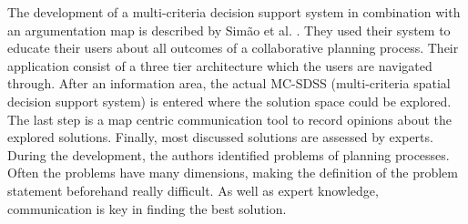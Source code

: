 The development of a multi-criteria decision support system in combination with an argumentation map is described by Sim\~{a}o et al. \cite{Simao2009Webbased}. They used their system to educate their users about all outcomes of a collaborative planning process. Their application consist of a three tier architecture which the users are navigated through. After an information area, the actual MC-SDSS (multi-criteria spatial decision support system) is entered where the solution space could be explored. The last step is a map centric communication tool to record opinions about the explored solutions. Finally, most discussed solutions are assessed by experts. During the development, the authors identified problems of planning processes. Often the problems have many dimensions, making the definition of the problem statement beforehand really difficult. As well as expert knowledge, communication is key in finding the best solution.

